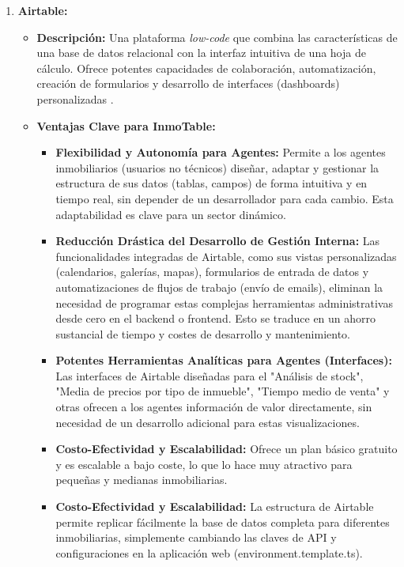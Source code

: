 \begin{enumerate}

    \item \textbf{Airtable:}
    \begin{itemize}
        \item \textbf{Descripción:} Una plataforma \textit{low-code} que combina las características de una base de datos relacional con la interfaz intuitiva de una hoja de cálculo. Ofrece potentes capacidades de colaboración, automatización, creación de formularios y desarrollo de interfaces (dashboards) personalizadas \cite{lodos2024notion} \cite{joinsecret2024airtable} \cite{back4app2024firebase} \cite{learningairtable2023}.

\clearpage

        \item \textbf{Ventajas Clave para InmoTable:}
        \begin{itemize}
            \item \textbf{Flexibilidad y Autonomía para Agentes:} Permite a los agentes inmobiliarios (usuarios no técnicos) diseñar, adaptar y gestionar la estructura de sus datos (tablas, campos) de forma intuitiva y en tiempo real, sin depender de un desarrollador para cada cambio. Esta adaptabilidad es clave para un sector dinámico.
            \item \textbf{Reducción Drástica del Desarrollo de Gestión Interna:} Las funcionalidades integradas de Airtable, como sus vistas personalizadas (calendarios, galerías, mapas), formularios de entrada de datos y automatizaciones de flujos de trabajo (envío de emails), eliminan la necesidad de programar estas complejas herramientas administrativas desde cero en el backend o frontend. Esto se traduce en un ahorro sustancial de tiempo y costes de desarrollo y mantenimiento.
            \item \textbf{Potentes Herramientas Analíticas para Agentes (Interfaces):} Las interfaces de Airtable diseñadas para el "Análisis de stock", "Media de precios por tipo de inmueble", "Tiempo medio de venta" y otras ofrecen a los agentes información de valor directamente, sin necesidad de un desarrollo adicional para estas visualizaciones.
            \item \textbf{Costo-Efectividad y Escalabilidad:} Ofrece un plan básico gratuito y es escalable a bajo coste, lo que lo hace muy atractivo para pequeñas y medianas inmobiliarias.
            \item \textbf{Costo-Efectividad y Escalabilidad:} La estructura de Airtable permite replicar fácilmente la base de datos completa para diferentes inmobiliarias, simplemente cambiando las claves de API y configuraciones en la aplicación web (environment.template.ts).
        \end{itemize}
    \end{itemize}


\end{enumerate}
